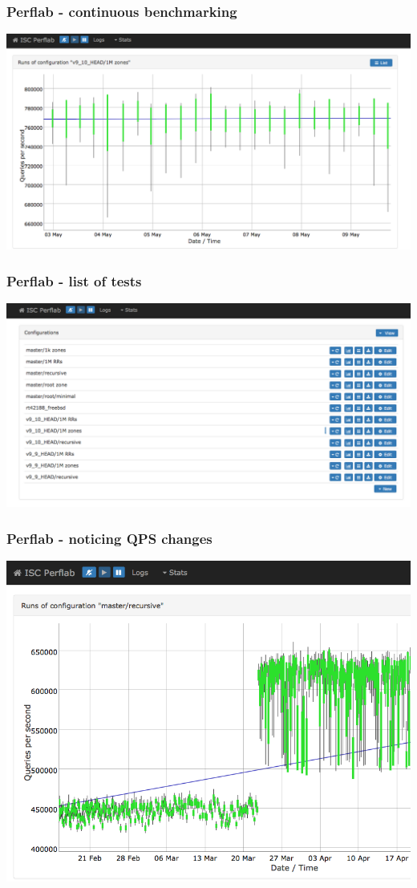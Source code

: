 \documentclass[aspectratio=169,14pt]{beamer}
\begin{document}
\frame
{
  \frametitle{Perflab - continuous benchmarking}

  \begin{center}
    \includegraphics[scale=0.3]{perf1.png}
  \end{center}
}

\frame
{
  \frametitle{Perflab - list of tests}

  \begin{center}
    \includegraphics[scale=0.3]{perf2.png}
  \end{center}
}

\frame
{
  \frametitle{Perflab - noticing QPS changes}

  \begin{center}
    \includegraphics[scale=0.3]{perf3.png}
  \end{center}
}
\end{document}
